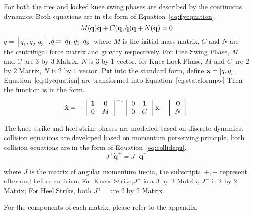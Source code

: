 \begin{itemize}
For both the free and locked knee swing phases are described by the continuous dynamics.
Both equations are in the form of Equation~\ref{eq:flyequation}.
\begin{equation}
\label{eq:flyequation}
M(\mathbf{q}) \ddot{\mathbf{q}} + C(\mathbf{q,\dot{q}})\dot{\mathbf{q}} + N(\mathbf{q}) = 0
\end{equation}
$q=[q_1,q_2,q_3]$,$\dot{q}=[\dot{q_1},\dot{q_2},\dot{q_3}]$
where $M$ is the initial mass matrix, $C$ and $N$ are the centrifugal force matrix and gravity respectively. 
For Free Swing Phase,  $M$ and $C$ are $3$ by $3$ Matrix, $N$ is $3$ by $1$ vector.
for Knee Lock Phase, $M$ and $C$ are $2$ by $2$ Matrix, $N$ is $2$ by $1$ vector.
Put into the standard form, define $\mathbf{x}=[q,\dot{q}]$, Equation~\ref{eq:flyequation} are transformed into Equation~\ref{eq:stateformpw}
Then the function is in the form.
\begin{equation}
\label{eq:stateformpw}
\dot{\mathbf{x}}=
-\left[ 
\begin{array}{cc}
\mathbf{1} &0\\
0 &M 
\end{array}
\right]^{-1}
\left[ 
\begin{array}{cc}
0 &\mathbf{1}\\
0 &C 
\end{array}
\right]\mathbf{x}
-\left[ 
\begin{array}{c}
\mathbf{0}\\
 N 
\end{array}
\right]
\end{equation}

The knee strike and heel strike phases are modelled based on discrete dynamics.
collision equations are developed based on momentum perserving principle.
both collision equations are in the form of Equation~\ref{eq:collidequ}.
\begin{equation}
\label{eq:collidequ}
J^{+}\dot{\mathbf{q}}^{+} = J^{-}\dot{\mathbf{q}}^{-}
\end{equation}

where $J$ is the matrix of angular momentum inetia, the subscripts~$+,-$ represent after and before collision.
For Knees Strike,$J^-$ is a 3 by 2 Matrix, $J^+$ is 2 by 2 Matrix;
For Heel Strike, both $J^{+,-}$ are 2 by 2 Matrix.
\end{itemize}
For the components of each matrix, please refer to the appendix.







